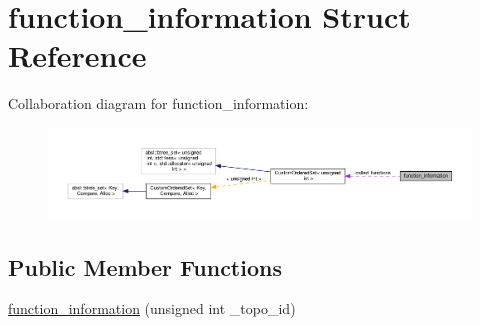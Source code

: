\hypertarget{structfunction__information}{}\section{function\+\_\+information Struct Reference}
\label{structfunction__information}


Collaboration diagram for function\+\_\+information\+:
\nopagebreak
\begin{figure}[H]
\begin{center}
\leavevmode
\includegraphics[width=350pt]{dc/dc6/structfunction__information__coll__graph}
\end{center}
\end{figure}
\subsection*{Public Member Functions}
\begin{DoxyCompactItemize}
\item 
\hyperlink{structfunction__information_a625bf421e2ff53787babc999452ce8af}{function\+\_\+information} (unsigned int \+\_\+topo\+\_\+id)
\end{DoxyCompactItemize}
